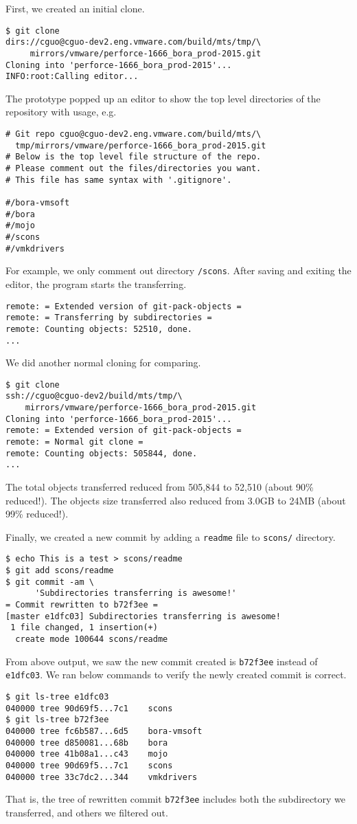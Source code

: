 \documentclass[preprint]{sigplanconf}
\begin{document}
First, we created an initial clone.
\begin{verbatim}
$ git clone
dirs://cguo@cguo-dev2.eng.vmware.com/build/mts/tmp/\
     mirrors/vmware/perforce-1666_bora_prod-2015.git
Cloning into 'perforce-1666_bora_prod-2015'...
INFO:root:Calling editor...
\end{verbatim}
The prototype popped up an editor to show the top level directories of the
repository with usage, e.g.
\begin{verbatim}
# Git repo cguo@cguo-dev2.eng.vmware.com/build/mts/\
  tmp/mirrors/vmware/perforce-1666_bora_prod-2015.git
# Below is the top level file structure of the repo.
# Please comment out the files/directories you want.
# This file has same syntax with '.gitignore'.

#/bora-vmsoft
#/bora
#/mojo
#/scons
#/vmkdrivers
\end{verbatim}

For example, we only comment out directory \verb|/scons|.
After saving and exiting the editor, the program starts the transferring.
\begin{verbatim}
remote: = Extended version of git-pack-objects =
remote: = Transferring by subdirectories =
remote: Counting objects: 52510, done.
...
\end{verbatim}

We did another normal cloning for comparing.
\begin{verbatim}
$ git clone
ssh://cguo@cguo-dev2/build/mts/tmp/\
    mirrors/vmware/perforce-1666_bora_prod-2015.git
Cloning into 'perforce-1666_bora_prod-2015'...
remote: = Extended version of git-pack-objects =
remote: = Normal git clone =
remote: Counting objects: 505844, done.
...
\end{verbatim}
The total objects transferred reduced from 505,844 to 52,510 (about 90\%
reduced!).
The objects size transferred also reduced from 3.0GB to 24MB (about 99\%
reduced!).

Finally, we created a new commit by adding a \verb|readme| file to \verb|scons/|
directory.
\begin{verbatim}
$ echo This is a test > scons/readme
$ git add scons/readme
$ git commit -am \
      'Subdirectories transferring is awesome!'
= Commit rewritten to b72f3ee =
[master e1dfc03] Subdirectories transferring is awesome!
 1 file changed, 1 insertion(+)
  create mode 100644 scons/readme
\end{verbatim}
From above output, we saw the new commit created is \verb|b72f3ee| instead of
\verb|e1dfc03|.
We ran below commands to verify the newly created commit is correct.
\begin{verbatim}
$ git ls-tree e1dfc03
040000 tree 90d69f5...7c1    scons
$ git ls-tree b72f3ee
040000 tree fc6b587...6d5    bora-vmsoft
040000 tree d850081...68b    bora
040000 tree 41b08a1...c43    mojo
040000 tree 90d69f5...7c1    scons
040000 tree 33c7dc2...344    vmkdrivers
\end{verbatim}
That is, the tree of rewritten commit \verb|b72f3ee| includes both
the subdirectory we transferred, and others we filtered out.
\end{document}
